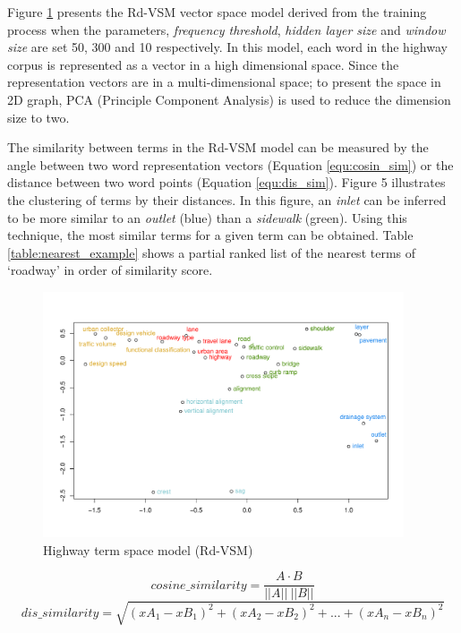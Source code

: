 \documentclass[Journal, BackFigs,NoLists, DoubleSpace]{ascelike}%
\begin{document}
%
\par
Figure \ref{fig:hvsm} presents the Rd-VSM vector space model derived from the training process when the parameters, \textit{frequency threshold}, \textit{hidden layer size} and \textit{window size} are set 50, 300 and 10 respectively. In this model, each word in the highway corpus is represented as a vector in a high dimensional space. Since the representation vectors are in a multi-dimensional space; to present the space in 2D graph, PCA (Principle Component Analysis) is used to reduce the dimension size to two.
\par
The similarity between terms in the Rd-VSM model can be measured by the angle between two word representation vectors (Equation \ref{equ:cosin_sim}) or the distance between two word points (Equation \ref{equ:dis_sim}). Figure 5 illustrates the clustering of terms by their distances. In this figure, an \textit{inlet} can be inferred to be more similar to an \textit{outlet} (blue) than a \textit{sidewalk} (green). Using this technique, the most similar terms for a given term can be obtained. Table \ref{table:nearest_example} shows a partial ranked list of the nearest terms of `roadway' in order of similarity score.
%
\begin{figure}[t]
	\centering
	\includegraphics[width=0.95\textwidth]{Figure5_hvsm_space}
	\caption{Highway term space model (Rd-VSM)}
	\label{fig:hvsm}
\end{figure}
%
\begin{equation}
\label{equ:cosin_sim}
cosine\_similarity = \frac{A \cdot B}{||A|| \: ||B||}
\end{equation}
%
\begin{equation}
\label{equ:dis_sim}
dis\_similarity =\sqrt{(xA_1-xB_1)^2+(xA_2-xB_2)^2+...+(xA_n-xB_n)^2}
\end{equation}
\end{document}
